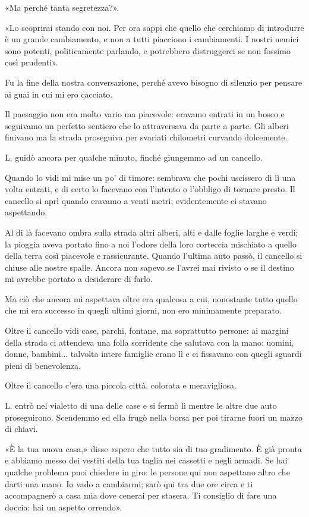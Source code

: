 \documentclass[a4paper,12pt]{book}
\begin{document}
«Ma perché tanta segretezza?».

«Lo scoprirai stando con noi. Per ora sappi che quello che cerchiamo di
introdurre è un grande cambiamento, e non a tutti piacciono i cambiamenti. I
nostri nemici sono potenti, politicamente parlando, e potrebbero distruggerci se
non fossimo così prudenti».

Fu la fine della nostra conversazione, perché avevo bisogno di silenzio per
pensare ai guai in cui mi ero cacciato.

Il paesaggio non era molto vario ma piacevole: eravamo entrati in un bosco e
seguivamo un perfetto sentiero che lo attraversava da parte a parte. Gli alberi
finivano ma la strada proseguiva per svariati chilometri curvando dolcemente.

L. guidò ancora per qualche minuto, finché giungemmo ad un cancello.

Quando lo vidi mi mise un po' di timore: sembrava che pochi uscissero di lì una
volta entrati, e di certo lo facevano con l'intento o l'obbligo di tornare
presto. Il cancello si aprì quando eravamo a venti metri; evidentemente ci
stavano aspettando.

Al di là facevano ombra sulla strada altri alberi, alti e dalle foglie larghe e
verdi; la pioggia aveva portato fino a noi l'odore della loro corteccia
mischiato a quello della terra così piacevole e rassicurante. Quando l'ultima
auto passò, il cancello si chiuse alle nostre spalle. Ancora non sapevo se
l'avrei mai rivisto o se il destino mi avrebbe portato a desiderare di farlo.

Ma ciò che ancora mi aspettava oltre era qualcosa a cui, nonostante tutto quello
che mi era successo in quegli ultimi giorni, non ero minimamente preparato.

Oltre il cancello vidi case, parchi, fontane, ma soprattutto persone: ai margini
della strada ci attendeva una folla sorridente che salutava con la mano: uomini,
donne, bambini... talvolta intere famiglie erano lì e ci fissavano con quegli
sguardi pieni di benevolenza.

Oltre il cancello c'era una piccola città, colorata e meravigliosa.

L. entrò nel vialetto di una delle case e si fermò lì mentre le altre due
auto proseguirono. Scendemmo ed ella frugò nella borsa per poi tirarne fuori un
mazzo di chiavi.

«È la tua nuova casa,» disse «spero che tutto sia di tuo gradimento. È già
pronta e abbiamo messo dei vestiti della tua taglia nei cassetti e negli
armadi. Se hai qualche problema puoi chiedere in giro: le persone qui non
aspettano altro che darti una mano. Io vado a cambiarmi; sarò qui tra due ore
circa e ti accompagnerò a casa mia dove cenerai per stasera. Ti consiglio di
fare una doccia: hai un aspetto orrendo».
\end{document}
